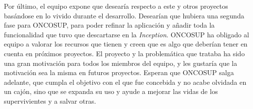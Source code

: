 Por último, el equipo expone que desearía respecto a este y otros proyectos basándose en lo vivido durante el desarrollo. Desearían que hubiera una segunda fase para ONCOSUP, para poder refinar la aplicación y añadir toda la funcionalidad que tuvo que descartarse en la \emph{Inception}. ONCOSUP ha obligado al equipo a valorar los recursos que tienen y creen que es algo que deberían tener en cuenta en próximos proyectos. El proyecto y la problemática que trataba ha sido una gran motivación para todos los miembros del equipo, y les gustaría que la motivación sea la misma en futuros proyectos. Esperan que ONCOSUP salga adelante, que cumpla el objetivo con el que fue concebida y no acabe olvidada en un cajón, sino que se expanda su uso y ayude a mejorar las vidas de los supervivientes y a salvar otras.

